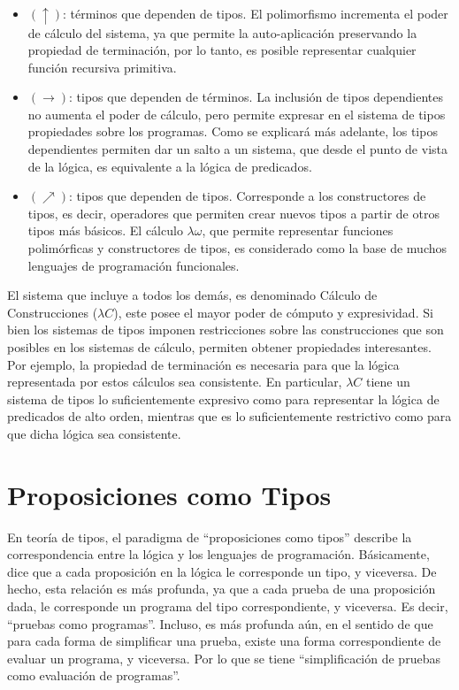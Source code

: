 \begin{itemize}
	\item $(\uparrow)$: términos que dependen de tipos.
	El polimorfismo incrementa el poder de cálculo del sistema, ya que permite la auto-aplicación preservando la propiedad de terminación, por lo tanto, es posible representar cualquier función recursiva primitiva.
	\item $(\rightarrow)$: tipos que dependen de términos.
	La inclusión de tipos dependientes no aumenta el poder de cálculo, pero permite expresar en el sistema de tipos propiedades sobre los programas.
	Como se explicará más adelante, los tipos dependientes permiten dar un salto a un sistema, que desde el punto de vista de la lógica, es equivalente a la lógica de predicados.
	\item $(\nearrow)$: tipos que dependen de tipos.
	Corresponde a los constructores de tipos, es decir, operadores que permiten crear nuevos tipos a partir de otros tipos más básicos.
	El cálculo $\lambda\omega$, que permite representar funciones polimórficas y constructores de tipos, es considerado como la base de muchos lenguajes de programación funcionales.
\end{itemize}

El sistema que incluye a todos los demás, es denominado Cálculo de Construcciones ($\lambda C$), este posee el mayor poder de cómputo y expresividad.
Si bien los sistemas de tipos imponen restricciones sobre las construcciones que son posibles en los sistemas de cálculo, permiten obtener propiedades interesantes.
Por ejemplo, la propiedad de terminación es necesaria para que la lógica representada por estos cálculos sea consistente.
En particular, $\lambda C$ tiene un sistema de tipos lo suficientemente expresivo como para representar la lógica de predicados de alto orden, mientras que es lo suficientemente restrictivo como para que dicha lógica sea consistente.


\section{Proposiciones como Tipos}
En teoría de tipos, el paradigma de ``proposiciones como tipos'' describe la correspondencia entre la lógica y los lenguajes de programación.
Básicamente, dice que a cada proposición en la lógica le corresponde un tipo, y viceversa.
De hecho, esta relación es más profunda, ya que a cada prueba de una proposición dada, le corresponde un programa del tipo correspondiente, y viceversa.
Es decir, ``pruebas como programas''.
Incluso, es más profunda aún, en el sentido de que para cada forma de simplificar una prueba, existe una forma correspondiente de evaluar un programa, y viceversa.
Por lo que se tiene ``simplificación de pruebas como evaluación de programas''.

